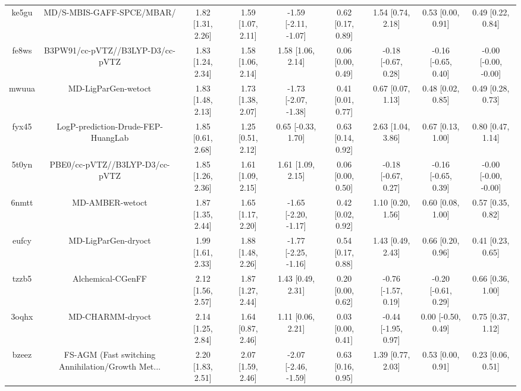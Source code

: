 \documentclass{article}
\begin{document}
\begin{center}
\begin{longtable}{|ccccccccc|}
 ke5gu &                          MD/S-MBIS-GAFF-SPCE/MBAR/ &  1.82 [1.31, 2.26] &  1.59 [1.07, 2.11] &  -1.59 [-2.11, -1.07] &  0.62 [0.17, 0.89] &    1.54 [0.74, 2.18] &    0.53 [0.00, 0.91] &     0.49 [0.22, 0.84] \\
 fe8ws &                   B3PW91/cc-pVTZ//B3LYP-D3/cc-pVTZ &  1.83 [1.24, 2.34] &  1.58 [1.06, 2.14] &     1.58 [1.06, 2.14] &  0.06 [0.00, 0.49] &  -0.18 [-0.67, 0.28] &  -0.16 [-0.65, 0.40] &  -0.00 [-0.00, -0.00] \\
 mwuua &                                MD-LigParGen-wetoct &  1.83 [1.48, 2.13] &  1.73 [1.38, 2.07] &  -1.73 [-2.07, -1.38] &  0.41 [0.01, 0.77] &    0.67 [0.07, 1.13] &    0.48 [0.02, 0.85] &     0.49 [0.28, 0.73] \\
 fyx45 &                 LogP-prediction-Drude-FEP-HuangLab &  1.85 [0.61, 2.68] &  1.25 [0.51, 2.12] &    0.65 [-0.33, 1.70] &  0.63 [0.14, 0.92] &    2.63 [1.04, 3.86] &    0.67 [0.13, 1.00] &     0.80 [0.47, 1.14] \\
 5t0yn &                     PBE0/cc-pVTZ//B3LYP-D3/cc-pVTZ &  1.85 [1.26, 2.36] &  1.61 [1.09, 2.15] &     1.61 [1.09, 2.15] &  0.06 [0.00, 0.50] &  -0.18 [-0.67, 0.27] &  -0.16 [-0.65, 0.39] &  -0.00 [-0.00, -0.00] \\
 6nmtt &                                    MD-AMBER-wetoct &  1.87 [1.35, 2.44] &  1.65 [1.17, 2.20] &  -1.65 [-2.20, -1.17] &  0.42 [0.02, 0.92] &    1.10 [0.20, 1.56] &    0.60 [0.08, 1.00] &     0.57 [0.35, 0.82] \\
 eufcy &                                MD-LigParGen-dryoct &  1.99 [1.61, 2.33] &  1.88 [1.48, 2.26] &  -1.77 [-2.25, -1.16] &  0.54 [0.17, 0.88] &    1.43 [0.49, 2.43] &    0.66 [0.20, 0.96] &     0.41 [0.23, 0.65] \\
 tzzb5 &                                  Alchemical-CGenFF &  2.12 [1.56, 2.57] &  1.87 [1.27, 2.44] &     1.43 [0.49, 2.31] &  0.20 [0.00, 0.62] &  -0.76 [-1.57, 0.19] &  -0.20 [-0.61, 0.29] &     0.66 [0.36, 1.00] \\
 3oqhx &                                   MD-CHARMM-dryoct &  2.14 [1.25, 2.84] &  1.64 [0.87, 2.46] &     1.11 [0.06, 2.21] &  0.03 [0.00, 0.41] &  -0.44 [-1.95, 0.97] &   0.00 [-0.50, 0.49] &     0.75 [0.37, 1.12] \\
 bzeez &  FS-AGM (Fast switching Annihilation/Growth Met... &  2.20 [1.83, 2.51] &  2.07 [1.59, 2.46] &  -2.07 [-2.46, -1.59] &  0.63 [0.16, 0.95] &    1.39 [0.77, 2.03] &    0.53 [0.00, 0.91] &     0.23 [0.06, 0.51] \\

\end{longtable}
\end{center}
\end{document}
